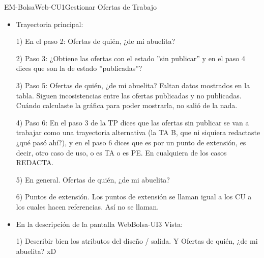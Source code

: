 \begin{UseCase}{EM-BolsaWeb-CU1}{Gestionar Ofertas de Trabajo}
{\begin{itemize}
					1) Propósito: Ofertas de quién, ¿de mi abuelita?

					2) Salidas: En el primer punto, Ofertas de quién, ¿de mi abuelita?, además, no son ofertas de trabajo registradas, son ofertas de trabajo PUBLICADAS. En la tabla, ¿qué es ''no''? 
			\item Trayectoria principal:

					1) En el paso 2: Ofertas de quién, ¿de mi abuelita? 

					2) Paso 3: ¿Obtiene las ofertas con el estado ''sin publicar'' y en el paso 4 dices que son la de estado ''publicadas''?

					3) Paso 5: Ofertas de quién, ¿de mi abuelita? Faltan datos mostrados en la tabla. Siguen incosistencias entre las ofertas publicadas y no publicadas. Cuándo calculaste la gráfica para poder mostrarla, no salió de la nada. 

					4) Paso 6: En el paso 3 de la TP dices que las ofertas sin publicar se van a trabajar como una trayectoria alternativa (la TA B, que ni siquiera redactaste ¿qué pasó ahí?), y en el paso 6 dices que es por un punto de extensión, es decir, otro caso de uso, o es TA o es PE. En cualquiera de los casos REDACTA.

					5) En general. Ofertas de quién, ¿de mi abuelita? 

					6) Puntos de extensión. Los puntos de extensión se llaman igual a los CU a los cuales hacen referencias. Así no se llaman.
			\item En la descripción de la pantalla WebBolsa-UI3 Vista:

					1) Describir bien los atributos del diseño / salida. Y Ofertas de quién, ¿de mi abuelita? xD
		\end{itemize}
	}
\end{UseCase}

